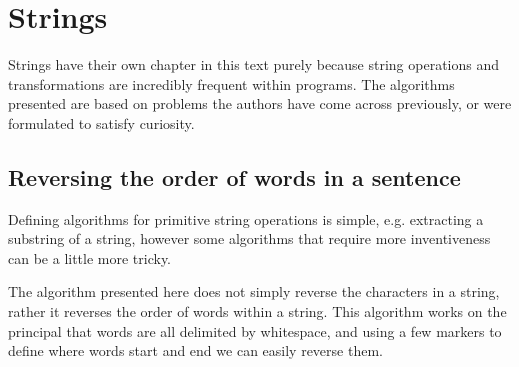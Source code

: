 \chapter{Strings}
Strings have their own chapter in this text purely because string operations and transformations are incredibly frequent within programs. The algorithms presented are based on problems the authors have come across previously, or were formulated to satisfy curiosity.

\section{Reversing the order of words in a sentence}
Defining algorithms for primitive string operations is simple, e.g. extracting a substring of a string, however some algorithms that require more inventiveness can be a little more tricky.

The algorithm presented here does not simply reverse the characters in a string, rather it reverses the order of words within a string. This algorithm works on the principal that words are all delimited by whitespace, and using a few markers to define where words start and end we can easily reverse them.

